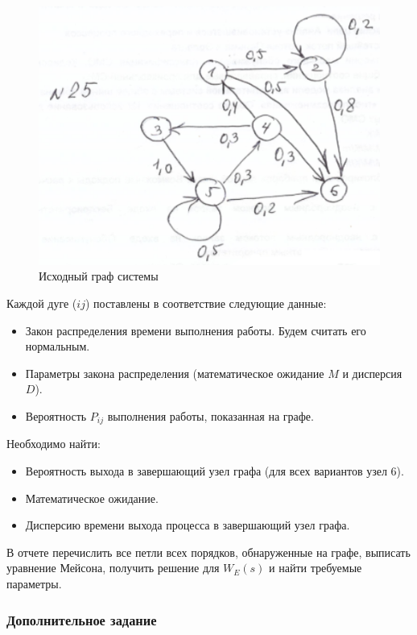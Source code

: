 \documentclass[14pt,a4paper,report]{report}
\begin{document}
\begin{figure}[h!]
	\centering
	\includegraphics[scale = 0.95]{images/0.png}
	\caption{Исходный граф системы}
	\label{image:0}
\end{figure}

Каждой дуге ($ij$) поставлены в соответствие следующие данные:

\begin{itemize}
	\item Закон распределения времени выполнения работы. Будем считать его нормальным.
	\item Параметры закона распределения (математическое ожидание $M$ и дисперсия $D$).
	\item Вероятность $P_{ij}$ выполнения работы, показанная на графе.
\end{itemize}

Необходимо найти:

\begin{itemize}
	\item Вероятность выхода в завершающий узел графа (для всех вариантов узел 6).
	\item Математическое ожидание.
	\item Дисперсию времени выхода процесса в завершающий узел графа.
\end{itemize}

В отчете перечислить все петли всех порядков, обнаруженные на графе, выписать уравнение Мейсона, получить решение для $W_E(s)$ и найти требуемые параметры.

\subsubsection{Дополнительное задание}
\end{document}
